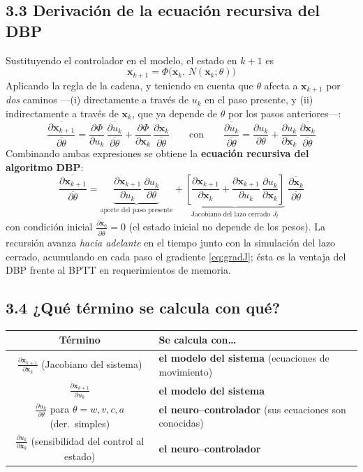 \documentclass[11pt,a4paper]{article}
\newcommand{\pd}[2]{\frac{\partial #1}{\partial #2}}
\newcommand{\td}[2]{\frac{\overline{\partial #1}}{\overline{\partial #2}}}
\begin{document}
\subsection*{3.3 Derivación de la ecuación recursiva del DBP}

Sustituyendo el controlador en el modelo, el estado en $k+1$ es
\[
\mathbf x_{k+1}=\Phi\bigl(\mathbf x_k,\,N(\mathbf x_k;\theta)\bigr)
\]
Aplicando la regla de la cadena, y teniendo en cuenta que $\theta$ afecta a $\mathbf x_{k+1}$ por \emph{dos} caminos —(i) directamente a través de $u_k$ en el paso presente, y (ii) indirectamente a través de $\mathbf x_k$, que ya depende de $\theta$ por los pasos anteriores—:
\[
\td{\mathbf x_{k+1}}{\theta}
=\pd{\Phi}{u_k}\,\td{u_k}{\theta}
+\pd{\Phi}{\mathbf x_k}\,\td{\mathbf x_k}{\theta}
\qquad\text{con}\qquad
\td{u_k}{\theta}=\pd{u_k}{\theta}+\pd{u_k}{\mathbf x_k}\,\td{\mathbf x_k}{\theta}
\]
Combinando ambas expresiones se obtiene la \textbf{ecuación recursiva del algoritmo DBP}:
\begin{equation}
\boxed{\;
\td{\mathbf x_{k+1}}{\theta}
=\underbrace{\pd{\mathbf x_{k+1}}{u_k}\,\pd{u_k}{\theta}}_{\text{aporte del paso presente}}
+\underbrace{\left[\pd{\mathbf x_{k+1}}{\mathbf x_k}
+\pd{\mathbf x_{k+1}}{u_k}\,\pd{u_k}{\mathbf x_k}\right]}_{\text{Jacobiano del lazo cerrado }J_t}
\;\td{\mathbf x_k}{\theta}
\;}
\label{eq:dbp}
\end{equation}
con condición inicial $\td{\mathbf x_0}{\theta}=0$ (el estado inicial no depende de los pesos). La recursión avanza \emph{hacia adelante} en el tiempo junto con la simulación del lazo cerrado, acumulando en cada paso el gradiente \eqref{eq:gradJ}; ésta es la ventaja del DBP frente al BPTT en requerimientos de memoria.

\subsection*{3.4 ¿Qué término se calcula con qué?}

\begin{center}
\renewcommand{\arraystretch}{1.5}
\small
\begin{tabular}{c l}
\toprule
Término & Se calcula con\dots\\
\midrule
$\pd{\mathbf x_{k+1}}{\mathbf x_k}$ (Jacobiano del sistema) & \textbf{el modelo del sistema} (ecuaciones de movimiento)\\
$\pd{\mathbf x_{k+1}}{u_k}$ & \textbf{el modelo del sistema}\\
$\pd{u_k}{\theta}$ para $\theta=w,v,c,a$ (der.\ simples) & \textbf{el neuro--controlador} (sus ecuaciones son conocidas)\\
$\pd{u_k}{\mathbf x_k}$ (sensibilidad del control al estado) & \textbf{el neuro--controlador}\\
\bottomrule
\end{tabular}
\end{center}
\end{document}
